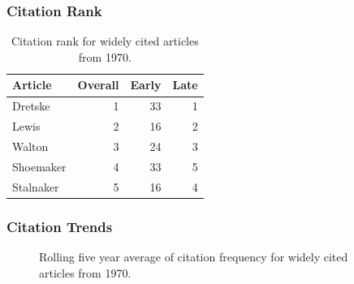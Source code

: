 \documentclass[
  10pt,
  letterpaper,
  DIV=11,
  numbers=noendperiod,
  twoside]{scrartcl}
\begin{document}
\subsubsection*{Citation Rank}\label{sec-rank-1970}

\begin{longtable}[]{@{}lrrr@{}}

\caption{\label{tbl-citation-rank-1970}Citation rank for widely cited
articles from 1970.}

\tabularnewline

\toprule\noalign{}
Article & Overall & Early & Late \\
\midrule\noalign{}
\endhead
\bottomrule\noalign{}
\endlastfoot
Dretske & 1 & 33 & 1 \\
Lewis & 2 & 16 & 2 \\
Walton & 3 & 24 & 3 \\
Shoemaker & 4 & 33 & 5 \\
Stalnaker & 5 & 16 & 4 \\

\end{longtable}

\subsubsection*{Citation Trends}\label{sec-trends-1970}

\begin{figure}


\caption{\label{fig-citation-spaghetti-1970}Rolling five year average of
citation frequency for widely cited articles from 1970.}

\end{figure}%
\end{document}
